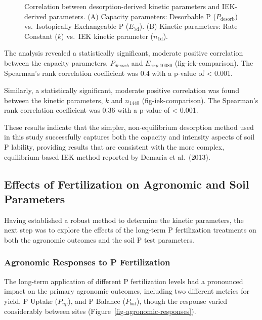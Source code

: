 \documentclass[
  a4paper,
]{article}
\begin{document}
\begin{figure}
\begin{minipage}{0.50\linewidth}
{}


\end{minipage}%

\caption{\label{fig-iek-comparison}Correlation between
desorption-derived kinetic parameters and IEK-derived parameters. (A)
Capacity parameters: Desorbable P (\(P_{\text{desorb}}\))
vs.~Isotopically Exchangeable P (\(E_{\text{7d}}\)). (B) Kinetic
parameters: Rate Constant (\(k\)) vs.~IEK kinetic parameter
(\(n_{\text{1d}}\)).}

\end{figure}%

The analysis revealed a statistically significant, moderate positive
correlation between the capacity parameters, \(P_{desorb}\) and
\(E_{exp\_10080}\) (fig-iek-comparison). The Spearman's rank correlation
coefficient was 0.4 with a p-value of \textless{} 0.001.

Similarly, a statistically significant, moderate positive correlation
was found between the kinetic parameters, \(k\) and \(n_{1440}\)
(fig-iek-comparison). The Spearman's rank correlation coefficient was
0.36 with a p-value of \textless{} 0.001.

These results indicate that the simpler, non-equilibrium desorption
method used in this study successfully captures both the capacity and
intensity aspects of soil P lability, providing results that are
consistent with the more complex, equilibrium-based IEK method reported
by Demaria et al.~(2013).

\subsection{Effects of Fertilization on Agronomic and Soil
Parameters}\label{sec-effects-of-fertilization-on-agronomic-and-soil-parameters}

Having established a robust method to determine the kinetic parameters,
the next step was to explore the effects of the long-term P
fertilization treatments on both the agronomic outcomes and the soil P
test parameters.

\subsubsection{Agronomic Responses to P
Fertilization}\label{sec-agronomic-responses-to-p-fertilization}

The long-term application of different P fertilization levels had a
pronounced impact on the primary agronomic outcomes, including two
different metrics for yield, P Uptake (\(P_{up}\)), and P Balance
(\(P_{bal}\)), though the response varied considerably between sites
(Figure~\ref{fig-agronomic-responses}).
\end{document}
